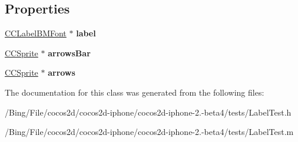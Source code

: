 \subsection*{Properties}
\begin{DoxyCompactItemize}
\item 
\hypertarget{interface_bitmap_font_multi_line_alignment_a5c47cb4ecad41b234b399a5358e6f0cd}{\hyperlink{interface_c_c_label_b_m_font}{C\-C\-Label\-B\-M\-Font} $\ast$ {\bfseries label}}\label{interface_bitmap_font_multi_line_alignment_a5c47cb4ecad41b234b399a5358e6f0cd}

\item 
\hypertarget{interface_bitmap_font_multi_line_alignment_a5d58589e86497073427bed3c3de045fc}{\hyperlink{class_c_c_sprite}{C\-C\-Sprite} $\ast$ {\bfseries arrows\-Bar}}\label{interface_bitmap_font_multi_line_alignment_a5d58589e86497073427bed3c3de045fc}

\item 
\hypertarget{interface_bitmap_font_multi_line_alignment_a0937aefa4558367dbab251a27f677435}{\hyperlink{class_c_c_sprite}{C\-C\-Sprite} $\ast$ {\bfseries arrows}}\label{interface_bitmap_font_multi_line_alignment_a0937aefa4558367dbab251a27f677435}

\end{DoxyCompactItemize}


The documentation for this class was generated from the following files\-:\begin{DoxyCompactItemize}
\item 
/\-Bing/\-File/cocos2d/cocos2d-\/iphone/cocos2d-\/iphone-\/2.-\/beta4/tests/Label\-Test.\-h\item 
/\-Bing/\-File/cocos2d/cocos2d-\/iphone/cocos2d-\/iphone-\/2.-\/beta4/tests/Label\-Test.\-m\end{DoxyCompactItemize}
